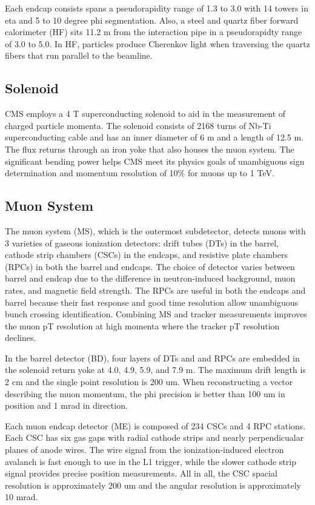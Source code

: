 \documentclass[12pt]{article}
\begin{document}
        Each endcap consists spans a pseudorapidity range of 1.3 to 3.0 with 14 towers in eta and 5 to 10 degree phi segmentation. Also, a steel and quartz fiber forward calorimeter (HF) sits 11.2 m from the interaction pipe in a pseudorapidty range of 3.0 to 5.0. In HF, particles produce Cherenkov light when traversing the quartz fibers that run parallel to the beamline. 

\subsection{Solenoid}
        CMS employs a 4 T superconducting solenoid to aid in the measurement of charged particle momenta. The solenoid consists of 2168 turns of Nb-Ti superconducting cable and has an inner diameter of 6 m and a length of 12.5 m. The flux returns through an iron yoke that also houses the muon system. The significant bending power helps CMS meet its physics goals of unambiguous sign determination and momentum resolution of 10\% for muons up to 1 TeV.

\subsection{Muon System}
        The muon system (MS), which is the outermost subdetector, detects muons with 3 varieties of gaseous ionization detectors: drift tubes (DTs) in the barrel, cathode strip chambers (CSCs) in the endcaps, and resistive plate chambers (RPCs) in both the barrel and endcaps. The choice of detector varies between barrel and endcap due to the difference in neutron-induced background, muon rates, and magnetic field strength. The RPCs are useful in both the endcaps and barrel because their fast response and good time resolution allow unambiguous bunch crossing identification. Combining MS and tracker measurements improves the muon pT resolution at high momenta where the tracker pT resolution declines.

        In the barrel detector (BD), four layers of DTs and and RPCs are embedded in the solenoid return yoke at 4.0, 4.9, 5.9, and 7.9 m. The maximum drift length is 2 cm and the single point resolution is 200 um. When reconstructing a vector describing the muon momentum, the phi precision is better than 100 um in position and 1 mrad in direction. 

        Each muon endcap detector (ME) is composed of 234 CSCs and 4 RPC stations. Each CSC has six gas gaps with radial cathode strips and nearly perpendicualar planes of anode wires. The wire signal from the ionization-induced electron avalanch is fast enough to use in the L1 trigger, while the slower cathode strip signal provides precise position measurements. All in all, the CSC spacial resolution is approximately 200 um and the angular resolution is approximately 10 mrad.
\end{document}
